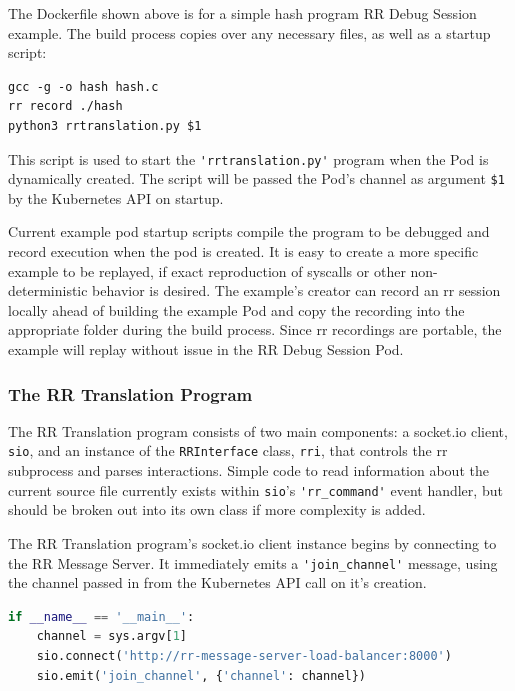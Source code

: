 \documentclass[12pt]{article}
\begin{document}
The Dockerfile shown above is for a simple hash program RR Debug
Session example.  The build process copies over any necessary files,
as well as a startup script:

\begin{lstlisting}[basicstyle=\linespread{0.5}\ttfamily,caption={Example Startup Script},captionpos=b]
gcc -g -o hash hash.c
rr record ./hash
python3 rrtranslation.py $1
\end{lstlisting}

This script is used to start the \lstinline{'rrtranslation.py'} program
when the Pod is dynamically created.  The script will be passed the
Pod's channel as argument \lstinline{$1} by the Kubernetes API on
startup.
\par

Current example pod startup scripts compile the program to be debugged
and record execution when the pod is created.  It is easy to create a
more specific example to be replayed, if exact reproduction of
syscalls or other non-deterministic behavior is desired.  The
example's creator can record an rr session locally ahead of building
the example Pod and copy the recording into the appropriate folder
during the build process.  Since rr recordings are portable, the
example will replay without issue in the RR Debug Session Pod.

\subsubsection{The RR Translation Program} \label{joiningchannel}

The RR Translation program consists of two main components: a socket.io
client, \lstinline{sio}, and an instance of the
\lstinline{RRInterface} class, \lstinline{rri}, that controls the rr
subprocess and parses interactions.  Simple code to read information
about the current source file currently exists within
\lstinline{sio}'s \lstinline{'rr_command'} event handler, but should
be broken out into its own class if more complexity is added.
\par

The RR Translation program's socket.io client instance begins by
connecting to the RR Message Server.  It immediately emits a
\lstinline{'join_channel'} message, using the channel passed in from
the Kubernetes API call on it's creation. 

\begin{lstlisting}[language=Python,basicstyle=\linespread{0.5}\ttfamily,caption={RR Translation Main},captionpos=b]
if __name__ == '__main__':
    channel = sys.argv[1]
    sio.connect('http://rr-message-server-load-balancer:8000')
    sio.emit('join_channel', {'channel': channel})
\end{lstlisting}
\end{document}
